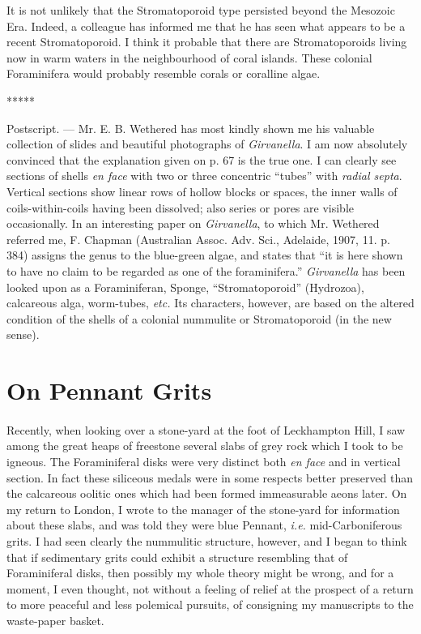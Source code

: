 \documentclass[a4paper, 12pt, oneside]{article}
\begin{document}
It is not unlikely that the Stromatoporoid type persisted beyond the Mesozoic Era. Indeed, a colleague has informed me that he has seen what appears to be a recent Stromatoporoid. I think it probable that there are Stromatoporoids living now in warm waters in the neighbourhood of coral islands. These colonial Foraminifera would probably resemble corals or coralline algae.

\centerline{*\hspace{15mm}*\hspace{15mm}*\hspace{15mm}*\hspace{15mm}*}
\bigskip

\small
{Postscript.} --- Mr. E. B. Wethered has most kindly shown me his valuable collection of slides and beautiful photographs of \emph{Girvanella}. I am now absolutely convinced that the explanation given on p. 67 is the true one. I can clearly see sections of shells \emph{en face} with two or three concentric ``tubes'' with \emph{radial septa}. Vertical sections show linear rows of hollow blocks or spaces, the inner walls of coils-within-coils having been dissolved; also series or pores are visible occasionally. In an interesting paper on \emph{Girvanella}, to which Mr. Wethered referred me, F. Chapman (Australian Assoc. Adv. Sci., Adelaide, 1907, 11. p. 384) assigns the genus to the blue-green algae, and states that ``it is here shown to have no claim to be regarded as one of the foraminifera.'' \emph{Girvanella} has been looked upon as a Foraminiferan, Sponge, ``Stromatoporoid'' (Hydrozoa), calcareous alga, worm-tubes, \emph{etc.} Its characters, however, are based on the altered condition of the shells of a colonial nummulite or Stromatoporoid (in the new sense).
\normalsize
\clearpage
\section{On Pennant Grits}
\Large
\paragraph{}
Recently, when looking over a stone-yard at the foot of Leckhampton Hill, I saw among the great heaps of freestone several slabs of grey rock which I took to be igneous. The Foraminiferal disks were very distinct both \emph{en face} and in vertical section. In fact these siliceous medals were in some respects better preserved than the calcareous oolitic ones which had been formed immeasurable aeons later. On my return to London, I wrote to the manager of the stone-yard for information about these slabs, and was told they were blue Pennant, \emph{i.e.} mid-Carboniferous grits. I had seen clearly the nummulitic structure, however, and I began to think that if sedimentary grits could exhibit a structure resembling that of Foraminiferal disks, then possibly my whole theory might be wrong, and for a moment, I even thought, not without a feeling of relief at the prospect of a return to more peaceful and less polemical pursuits, of consigning my manuscripts to the waste-paper basket.
\end{document}
